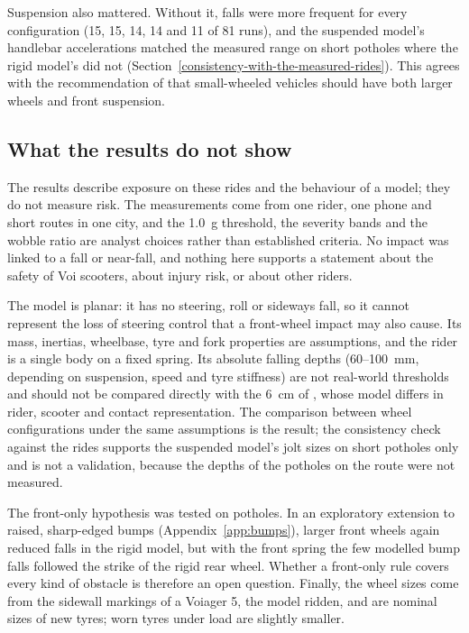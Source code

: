 Suspension also mattered. Without it, falls were more frequent for every configuration (15,
15, 14, 14 and 11 of 81 runs), and the suspended model's handlebar accelerations matched the
measured range on short potholes where the rigid model's did not
(Section~\ref{consistency-with-the-measured-rides}). This agrees with the recommendation of
\textcite{paudel2025} that small-wheeled vehicles should have both larger wheels and front
suspension.

\subsection{What the results do not show}

The results describe exposure on these rides and the behaviour of a model; they do not
measure risk. The measurements come from one rider, one phone and short routes in one city,
and the 1.0~g threshold, the severity bands and the wobble ratio are analyst choices rather
than established criteria. No impact was linked to a fall or near-fall, and nothing here
supports a statement about the safety of Voi scooters, about injury risk, or about other
riders.

The model is planar: it has no steering, roll or sideways fall, so it cannot represent the
loss of steering control that a front-wheel impact may also cause. Its mass, inertias,
wheelbase, tyre and fork properties are assumptions, and the rider is a single body on a
fixed spring. Its absolute falling depths (60--100~mm, depending on suspension, speed and
tyre stiffness) are not real-world thresholds and should not be compared directly with the
6~cm of \textcite{posirisuk2022}, whose model differs in rider, scooter and contact
representation. The comparison between wheel configurations under the same assumptions is
the result; the consistency check against the rides supports the suspended model's jolt
sizes on short potholes only and is not a validation, because the depths of the potholes on
the route were not measured.

The front-only hypothesis was tested on potholes. In an exploratory extension to raised,
sharp-edged bumps (Appendix~\ref{app:bumps}), larger front wheels again reduced falls in the
rigid model, but with the front spring the few modelled bump falls followed the strike of the
rigid rear wheel. Whether a front-only rule covers every kind of obstacle is therefore an open
question. Finally, the wheel sizes come from the sidewall markings of a Voiager 5, the
model ridden, and are nominal sizes of new tyres; worn tyres under load are slightly
smaller.

